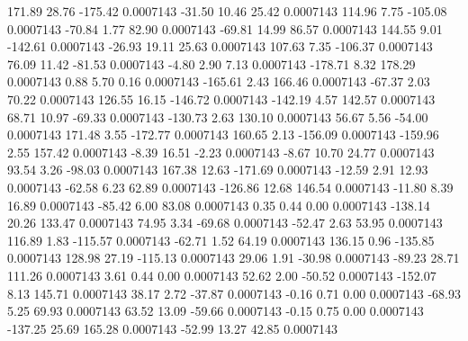       171.89       28.76     -175.42     0.0007143
      -31.50       10.46       25.42     0.0007143
      114.96        7.75     -105.08     0.0007143
      -70.84        1.77       82.90     0.0007143
      -69.81       14.99       86.57     0.0007143
      144.55        9.01     -142.61     0.0007143
      -26.93       19.11       25.63     0.0007143
      107.63        7.35     -106.37     0.0007143
       76.09       11.42      -81.53     0.0007143
       -4.80        2.90        7.13     0.0007143
     -178.71        8.32      178.29     0.0007143
        0.88        5.70        0.16     0.0007143
     -165.61        2.43      166.46     0.0007143
      -67.37        2.03       70.22     0.0007143
      126.55       16.15     -146.72     0.0007143
     -142.19        4.57      142.57     0.0007143
       68.71       10.97      -69.33     0.0007143
     -130.73        2.63      130.10     0.0007143
       56.67        5.56      -54.00     0.0007143
      171.48        3.55     -172.77     0.0007143
      160.65        2.13     -156.09     0.0007143
     -159.96        2.55      157.42     0.0007143
       -8.39       16.51       -2.23     0.0007143
       -8.67       10.70       24.77     0.0007143
       93.54        3.26      -98.03     0.0007143
      167.38       12.63     -171.69     0.0007143
      -12.59        2.91       12.93     0.0007143
      -62.58        6.23       62.89     0.0007143
     -126.86       12.68      146.54     0.0007143
      -11.80        8.39       16.89     0.0007143
      -85.42        6.00       83.08     0.0007143
        0.35        0.44        0.00     0.0007143
     -138.14       20.26      133.47     0.0007143
       74.95        3.34      -69.68     0.0007143
      -52.47        2.63       53.95     0.0007143
      116.89        1.83     -115.57     0.0007143
      -62.71        1.52       64.19     0.0007143
      136.15        0.96     -135.85     0.0007143
      128.98       27.19     -115.13     0.0007143
       29.06        1.91      -30.98     0.0007143
      -89.23       28.71      111.26     0.0007143
        3.61        0.44        0.00     0.0007143
       52.62        2.00      -50.52     0.0007143
     -152.07        8.13      145.71     0.0007143
       38.17        2.72      -37.87     0.0007143
       -0.16        0.71        0.00     0.0007143
      -68.93        5.25       69.93     0.0007143
       63.52       13.09      -59.66     0.0007143
       -0.15        0.75        0.00     0.0007143
     -137.25       25.69      165.28     0.0007143
      -52.99       13.27       42.85     0.0007143
